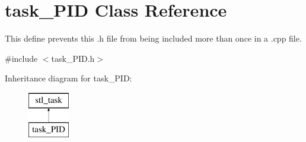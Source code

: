 \hypertarget{classtask___p_i_d}{\section{task\-\_\-\-P\-I\-D Class Reference}
\label{classtask___p_i_d}
}


This define prevents this .h file from being included more than once in a .cpp file.  




{\ttfamily \#include $<$task\-\_\-\-P\-I\-D.\-h$>$}

Inheritance diagram for task\-\_\-\-P\-I\-D\-:\begin{figure}[H]
\begin{center}
\leavevmode
\includegraphics[height=2.000000cm]{classtask___p_i_d}
\end{center}
\end{figure}
